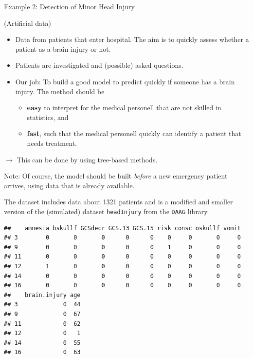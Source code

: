 \documentclass[10pt,ignorenonframetext,]{beamer}
\begin{document}
\begin{frame}

\begin{block}{Example 2: Detection of Minor Head Injury}

\tiny
(Artificial data) \vspace{2mm}

\normalsize

\begin{itemize}
\item
  Data from patients that enter hospital. The aim is to quickly assess
  whether a patient as a brain injury or not.
\item
  Patients are investigated and (possible) asked questions.
\item
  Our job: To build a good model to predict quickly if someone has a
  brain injury. The method should be

  \begin{itemize}
  \item
    \textbf{easy} to interpret for the medical personell that are not
    skilled in statistics, and
  \item
    \textbf{fast}, such that the medical personell quickly can identify
    a patient that needs treatment.
  \end{itemize}
\end{itemize}

\(\rightarrow\) This can be done by using tree-based methods.

\vspace{4mm}

\small
Note: Of course, the model should be built \emph{before} a new emergency
patient arrives, using data that is already available.

\end{block}

\end{frame}

\begin{frame}[fragile]

The dataset includes data about 1321 patients and is a modified and
smaller version of the (simulated) dataset \texttt{headInjury} from the
\texttt{DAAG} library.

\footnotesize

\begin{verbatim}
##    amnesia bskullf GCSdecr GCS.13 GCS.15 risk consc oskullf vomit
## 3        0       0       0      0      0    0     0       0     0
## 9        0       0       0      0      0    1     0       0     0
## 11       0       0       0      0      0    0     0       0     0
## 12       1       0       0      0      0    0     0       0     0
## 14       0       0       0      0      0    0     0       0     0
## 16       0       0       0      0      0    0     0       0     0
##    brain.injury age
## 3             0  44
## 9             0  67
## 11            0  62
## 12            0   1
## 14            0  55
## 16            0  63
\end{verbatim}

\normalsize

\end{frame}
\end{document}
